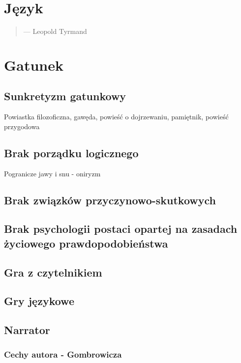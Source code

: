 \documentclass[a4paper]{article}
\begin{document}
\section{Język}
\begin{quotation}
     --- Leopold Tyrmand
\end{quotation}
\begin{quotation}
\end{quotation}
\begin{quotation}
\end{quotation}
\begin{quotation}
\end{quotation}
\section{Gatunek}
\subsection{Sunkretyzm gatunkowy}
Powiastka filozoficzna, gawęda, powieść o dojrzewaniu, pamiętnik, powieść przygodowa
\subsection{Brak porządku logicznego}
Pogranicze jawy i snu - oniryzm
\subsection{Brak związków przyczynowo-skutkowych}
\subsection{Brak psychologii postaci opartej na zasadach życio\-wego prawdopodobieństwa}
\subsection{Gra z czytelnikiem}
\subsection{Gry językowe}
\subsection{Narrator}
\subsubsection{Cechy autora - Gombrowicza}
\end{document}
